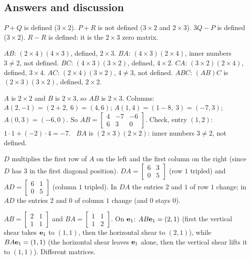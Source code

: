 \documentclass[11pt]{article}
\begin{document}
\subsection*{Answers and discussion}
\begin{description}[leftmargin=0pt,itemsep=5pt]
  \item[Knowledge Check \ref{kc:addsizes}.] $P+Q$ is defined ($3\times2$). $P+R$ is not defined ($3\times2$ and $2\times3$). $3Q-P$ is defined ($3\times2$). $R-R$ is defined: it is the $2\times3$ zero matrix.
  \item[Knowledge Check \ref{kc:prodsizes}.] $AB$: $(2\times4)(4\times3)$, defined, $2\times3$. $BA$: $(4\times3)(2\times4)$, inner numbers $3\neq2$, not defined. $BC$: $(4\times3)(3\times2)$, defined, $4\times2$. $CA$: $(3\times2)(2\times4)$, defined, $3\times4$. $AC$: $(2\times4)(3\times2)$, $4\neq3$, not defined. $ABC$: $(AB)C$ is $(2\times3)(3\times2)$, defined, $2\times2$.
  \item[Knowledge Check \ref{kc:prodcompute}.] $A$ is $2\times2$ and $B$ is $2\times3$, so $AB$ is $2\times3$. Columns: $A(2,-1)=(2+2,\ 6)=(4,6)$; $A(1,4)=(1-8,\ 3)=(-7,3)$; $A(0,3)=(-6,0)$. So $AB=\begin{bmatrix}4&-7&-6\\6&3&0\end{bmatrix}$. Check, entry $(1,2)$: $1\cdot1+(-2)\cdot4=-7$. \ $BA$ is $(2\times3)(2\times2)$: inner numbers $3\neq2$, not defined.
  \item[Knowledge Check \ref{kc:scaling}.] $D$ multiplies the first row of $A$ on the left and the first column on the right (since $D$ has $3$ in the first diagonal position). $DA=\begin{bmatrix}6&3\\0&5\end{bmatrix}$ (row $1$ tripled) and $AD=\begin{bmatrix}6&1\\0&5\end{bmatrix}$ (column $1$ tripled). In $DA$ the entries $2$ and $1$ of row $1$ change; in $AD$ the entries $2$ and $0$ of column $1$ change (and $0$ stays $0$).
  \item[Knowledge Check \ref{kc:order}.] $AB=\begin{bmatrix}2&1\\1&1\end{bmatrix}$ and $BA=\begin{bmatrix}1&1\\1&2\end{bmatrix}$. On $\mathbf{e}_1$: $AB\mathbf{e}_1=(2,1)$ (first the vertical shear takes $\mathbf{e}_1$ to $(1,1)$, then the horizontal shear to $(2,1)$), while $BA\mathbf{e}_1=(1,1)$ (the horizontal shear leaves $\mathbf{e}_1$ alone, then the vertical shear lifts it to $(1,1)$). Different matrices.

\end{description}
\end{document}
